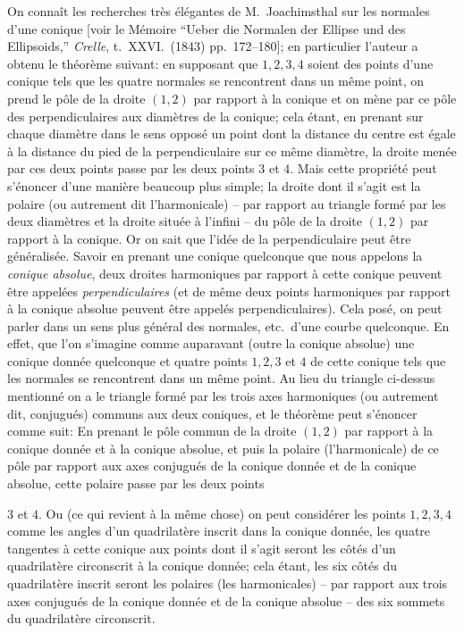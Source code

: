\documentclass[11pt,a4paper]{article}
\begin{document}
On conna\^it les recherches tr\`es \'el\'egantes de M.~Joachimsthal sur les
normales d'une conique [voir le M\'emoire ``Ueber die Normalen der Ellipse und des
Ellipsoids,'' \textit{Crelle}, t.~XXVI.\ (1843) pp.~172--180]; en particulier
l'auteur a obtenu le th\'eor\`eme suivant: en supposant que $1, 2, 3, 4$ soient des
points d'une conique tels que les quatre normales se rencontrent dans un m\^eme
point, on prend le p\^ole de la droite $(1, 2)$ par rapport \`a la conique et on
m\`ene par ce p\^ole des perpendiculaires aux diam\`etres de la conique; cela
\'etant, en prenant sur chaque diam\`etre dans le sens oppos\'e un point dont la
distance du centre est \'egale \`a la distance du pied de la perpendiculaire sur
ce m\^eme diam\`etre, la droite men\'ee par ces deux points passe par les deux
points $3$ et $4$. Mais cette propri\'et\'e peut s'\'enoncer d'une mani\`ere
beaucoup plus simple; la droite dont il s'agit est la polaire (ou autrement dit
l'harmonicale) -- par rapport au triangle form\'e par les deux diam\`etres et la
droite situ\'ee \`a l'infini -- du p\^ole de la droite $(1, 2)$ par rapport \`a
la conique. Or on sait que l'id\'ee de la perpendiculaire peut \^etre
g\'en\'eralis\'ee. Savoir en prenant une conique quelconque que nous appelons la
\textit{conique absolue}, deux droites harmoniques par rapport \`a cette conique
peuvent \^etre appel\'ees \textit{perpendiculaires} (et de m\^eme deux points
harmoniques par rapport \`a la conique absolue peuvent \^etre appel\'es
perpendiculaires). Cela pos\'e, on peut parler dans un sens plus g\'en\'eral des
normales, etc.\ d'une courbe quelconque. En effet, que l'on s'imagine comme
auparavant (outre la conique absolue) une conique donn\'ee quelconque et quatre
points $1, 2, 3$ et $4$ de cette conique tels que les normales se rencontrent
dans un m\^eme point. Au lieu du triangle ci-dessus mentionn\'e on a le triangle
form\'e par les trois axes harmoniques (ou autrement dit, conjugu\'es) communs aux
deux coniques, et le th\'eor\`eme peut s'\'enoncer comme suit: En prenant le p\^ole
commun de la droite $(1, 2)$ par rapport \`a la conique donn\'ee et \`a la conique
absolue, et puis la polaire (l'harmonicale) de ce p\^ole par rapport aux axes
conjugu\'es de la conique donn\'ee et de la conique absolue, cette polaire passe
par les deux points

\setcounter{page}{75}

$3$ et $4$. Ou (ce qui revient \`a la m\^eme chose) on peut consid\'erer les
points $1, 2, 3, 4$ comme les angles d'un quadrilat\`ere inscrit dans la conique
donn\'ee, les quatre tangentes \`a cette conique aux points dont il s'agit seront
les c\^ot\'es d'un quadrilat\`ere circonscrit \`a la conique donn\'ee; cela \'etant,
les six c\^ot\'es du quadrilat\`ere inscrit seront les polaires (les harmonicales)
-- par rapport aux trois axes conjugu\'es de la conique donn\'ee et de la conique
absolue -- des six sommets du quadrilat\`ere circonscrit.
\end{document}
